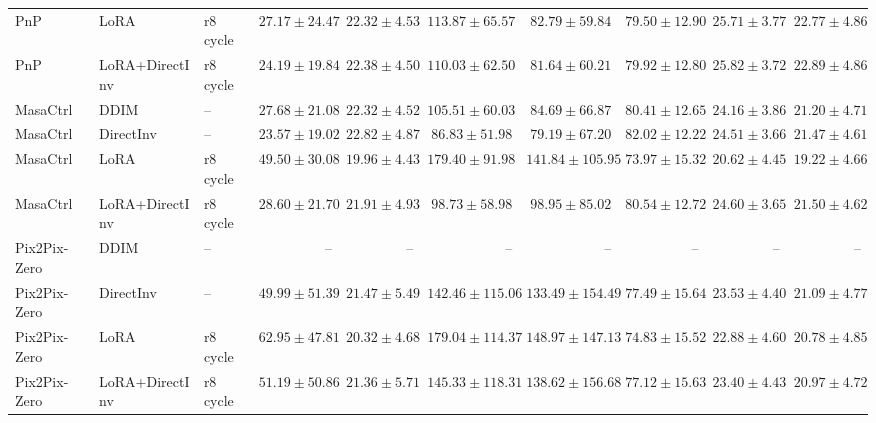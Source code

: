 \documentclass[11pt]{article}
\begin{document}
\begin{table}[htbp]
{\begin{tabular}{lll rrrrrrr}
    PnP & LoRA & r8 cycle & $27.17 \pm 24.47$ & $22.32 \pm 4.53$ & $113.87 \pm 65.57$ & $82.79 \pm 59.84$ & $79.50 \pm 12.90$ & $25.71 \pm 3.77$ & $22.77 \pm 4.86$ \tabularnewline
    PnP & LoRA+DirectInv & r8 cycle & $24.19 \pm 19.84$ & $22.38 \pm 4.50$ & $110.03 \pm 62.50$ & $81.64 \pm 60.21$ & $79.92 \pm 12.80$ & $\mathbf{25.82 \pm 3.72}$ & $\mathbf{22.89 \pm 4.86}$ \tabularnewline
    \midrule
    MasaCtrl & DDIM & -- & $27.68 \pm 21.08$ & $22.32 \pm 4.52$ & $105.51 \pm 60.03$ & $84.69 \pm 66.87$ & $80.41 \pm 12.65$ & $24.16 \pm 3.86$ & $21.20 \pm 4.71$ \tabularnewline
    MasaCtrl & DirectInv & -- & $\mathbf{23.57 \pm 19.02}$ & $\mathbf{22.82 \pm 4.87}$ & $\mathbf{86.83 \pm 51.98}$ & $\mathbf{79.19 \pm 67.20}$ & $\mathbf{82.02 \pm 12.22}$ & $24.51 \pm 3.66$ & $21.47 \pm 4.61$ \tabularnewline
    MasaCtrl & LoRA & r8 cycle & $49.50 \pm 30.08$ & $19.96 \pm 4.43$ & $179.40 \pm 91.98$ & $141.84 \pm 105.95$ & $73.97 \pm 15.32$ & $20.62 \pm 4.45$ & $19.22 \pm 4.66$ \tabularnewline
    MasaCtrl & LoRA+DirectInv & r8 cycle & $28.60 \pm 21.70$ & $21.91 \pm 4.93$ & $98.73 \pm 58.98$ & $98.95 \pm 85.02$ & $80.54 \pm 12.72$ & $\mathbf{24.60 \pm 3.65}$ & $\mathbf{21.50 \pm 4.62}$ \tabularnewline
    \midrule
    Pix2Pix-Zero & DDIM & -- & -- & -- & -- & -- & -- & -- & -- \tabularnewline
    Pix2Pix-Zero & DirectInv & -- & $\mathbf{49.99 \pm 51.39}$ & $\mathbf{21.47 \pm 5.49}$ & $\mathbf{142.46 \pm 115.06}$ & $\mathbf{133.49 \pm 154.49}$ & $\mathbf{77.49 \pm 15.64}$ & $\mathbf{23.53 \pm 4.40}$ & $\mathbf{21.09 \pm 4.77}$ \tabularnewline
    Pix2Pix-Zero & LoRA & r8 cycle & $62.95 \pm 47.81$ & $20.32 \pm 4.68$ & $179.04 \pm 114.37$ & $148.97 \pm 147.13$ & $74.83 \pm 15.52$ & $22.88 \pm 4.60$ & $20.78 \pm 4.85$ \tabularnewline
    Pix2Pix-Zero & LoRA+DirectInv & r8 cycle & $51.19 \pm 50.86$ & $21.36 \pm 5.71$ & $145.33 \pm 118.31$ & $138.62 \pm 156.68$ & $77.12 \pm 15.63$ & $23.40 \pm 4.43$ & $20.97 \pm 4.72$ \tabularnewline
    \bottomrule
  \end{tabular}
  }
\end{table}
\end{document}
